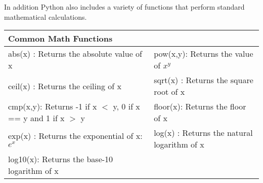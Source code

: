 \documentclass[letterpaper,11pt]{article}
\begin{document}
\par{In addition Python also includes a variety of functions that perform
standard mathematical calculations.}
\\
\begin{tabular}[t]{l  l}
    \textbf{Common Math Functions} & \\
    \hline
    abs(x)  : Returns the absolute value of x                     & pow(x,y): Returns the value of $x^y$         \\
    ceil(x) : Returns the ceiling of x                            & sqrt(x) : Returns the square root of x       \\
    cmp(x,y): Returns -1 if x $<$ y, 0 if x == y and 1 if x $>$ y & floor(x): Returns the floor of x             \\
    exp(x)  : Returns the exponential of x: $e^x$                 & log(x)  : Returns the natural logarithm of x \\
    log10(x): Returns the base-10 logarithm of x                  &                                              \\
\end{tabular}
\end{document}
